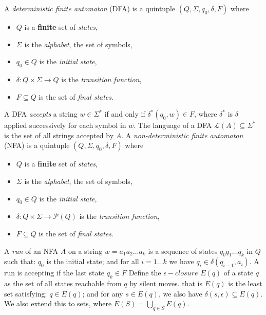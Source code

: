 A \textit{deterministic finite automaton} (DFA) is a quintuple $(Q, \Sigma, q_0, \delta, F)$ where
\begin{itemize}
    \item $Q$ is a \textbf{finite} set of \textit{states},
    \item $\Sigma$ is the \textit{alphabet}, the set of symbols,
    \item $q_0 \in Q$ is the \textit{initial state},
    \item $\delta: Q \times \Sigma \to Q$ is the \textit{transition function},
    \item $F \subseteq Q$ is the set of \textit{final states}.
\end{itemize}
 A DFA \textit{accepts} a string $w \in \Sigma^*$ if and only if $\delta^* (q_0, w) \in F$, where $\delta^*$ is $\delta$ applied successively for each symbol in $w$. The language of a DFA $\mathcal{L}(A) \subseteq \Sigma^*$ is the set of all strings accepted by $A$.
 A \textit{non-deterministic finite automaton} (NFA) is a quintuple $(Q, \Sigma, q_0, \delta, F)$ where
\begin{itemize}
    \item $Q$ is a \textbf{finite} set of \textit{states},
    \item $\Sigma$ is the \textit{alphabet}, the set of symbols,
    \item $q_0 \in Q$ is the \textit{initial state},
    \item $\delta: Q \times \Sigma \to \mathcal{P}(Q)$ is the \textit{transition function},
    \item $F \subseteq Q$ is the set of \textit{final states}.
\end{itemize}
  A \textit{run} of an NFA $A$ on a string $w = a_1 a_2 \ldots a_k$ is a sequence of states $q_0 q_1 \ldots q_k$ in $Q$ such that: $q_0$ is the initial state; and for all $i = 1 \ldots k$ we have $q_i \in \delta(q_{i-1}, a_i)$.
A run is accepting if the last state $q_k \in F$
 Define the $\epsilon-closure$ $E(q)$ of a state $q$ as the set of all states reachable from $q$ by silent moves. that is $E(q)$ is the least set satisfying: $q \in E(q)$; and for any $s \in E(q)$, we also have $\delta(s, \epsilon) \subseteq E(q)$.
We also extend this to sets, where $E(S) = \bigcup_{q \in S}E(q)$.